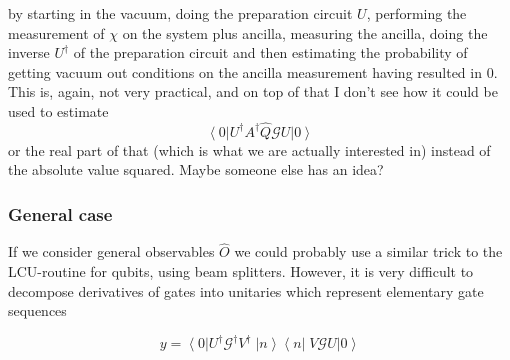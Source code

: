 \documentclass[aps,pra,10pt,twocolumn,groupedaddress,nofootinbib]{revtex4-1}
\theoremstyle{plain}
\newcommand{\ket}[1]{\ensuremath{\left| #1 \right \rangle}}
\newcommand{\bra}[1]{\ensuremath{\left \langle #1 \right |}}
\newcommand{\ketbra}[2]{\ket{#1}\bra{#2}}
\newcommand{\G}{\mathcal{G}}
\begin{document}
\begin{description}
  by starting in the vacuum, doing the preparation circuit $U$, performing the measurement of $\chi$ on the system plus ancilla, measuring the ancilla, doing the inverse $U^\dagger$ of the preparation circuit and then estimating the probability of getting vacuum out conditions on the ancilla measurement having resulted in $0$.
  This is, again, not very practical, and on top of that I don't see how it could be used to estimate 
  \begin{equation}
    \bra{0} U^\dagger A^{\dagger}  \hat{Q} \G U \ket{0}
  \end{equation}
  or the real part of that (which is what we are actually interested in) instead of the absolute value squared.
  Maybe someone else has an idea?
\end{description}



\subsubsection{General case}

If we consider general observables $\hat{O}$ we could probably use a similar trick to the LCU-routine for qubits, using beam splitters. However, it is very difficult to decompose derivatives of gates into unitaries which represent elementary gate sequences 

\[ y = \bra{0}U^{\dagger} \G^{\dagger} V^{\dagger} \; \ketbra{n}{n} \; V \G U \ket{0} \]
\end{document}

